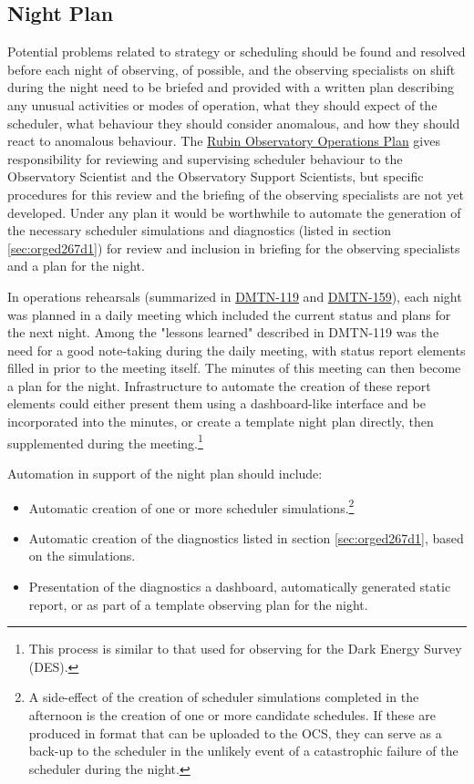\subsection{Night Plan}
\label{sec:org87d80b7}

Potential problems related to strategy or scheduling should be found and resolved before each night of observing, of possible, and the observing specialists on shift during the night need to be briefed and provided with a written plan describing any unusual activities or modes of operation, what they should expect of the scheduler, what behaviour they should consider anomalous, and how they should react to anomalous behaviour.
The \href{https://docushare.lsst.org/docushare/dsweb/Get/Document-36797/Rubin\%20Observatory\%20Operations\%20Plan\%20April\%202020.pdf}{Rubin Observatory Operations Plan} gives responsibility for reviewing and supervising scheduler behaviour to the Observatory Scientist and the Observatory Support Scientists, but specific procedures for this review and the briefing of the observing specialists are not yet developed.
Under any plan it would be worthwhile to automate the generation of the necessary scheduler simulations and diagnostics (listed in section \ref{sec:orged267d1}) for review and inclusion in briefing for the observing specialists and a plan for the night.

In operations rehearsals (summarized in \href{https://dmtn-119.lsst.io}{DMTN-119} and \href{https://dmtn-159.lsst.io/}{DMTN-159}), each night was planned in a daily meeting which included the current status and plans for the next night.
Among the "lessons learned" described in DMTN-119 was the need for a good note-taking during the daily meeting, with status report elements filled in prior to the meeting itself. 
The minutes of this meeting can then become a plan for the night.
Infrastructure to automate the creation of these report elements could either present them using a dashboard-like interface and be incorporated into the minutes, or create a template night plan directly, then supplemented during the meeting.\footnote{This process is similar to that used for observing for the Dark Energy Survey (DES).}

Automation in support of the night plan should include:
\begin{itemize}
\item Automatic creation of one or more scheduler simulations.\footnote{A side-effect of the creation of scheduler simulations completed in the afternoon is the creation of one or more candidate schedules. If these are produced in format that can be uploaded to the OCS, they can serve as a back-up to the scheduler in the unlikely event of a catastrophic failure of the scheduler during the night.}
\item Automatic creation of the diagnostics listed in section \ref{sec:orged267d1}, based on the simulations.
\item Presentation of the diagnostics a dashboard, automatically generated static report, or as part of a template observing plan for the night.
\end{itemize}

